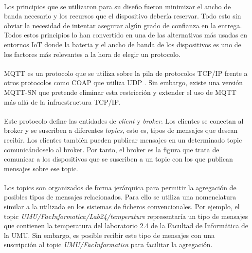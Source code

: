 \documentclass[12pt, a4paper]{article}
\begin{document}
        \paragraph{}
        Los principios que se utilizaron para su diseño fueron minimizar el ancho de banda necesario y los recursos que el dispositivo debería reservar. Todo esto sin obviar la necesidad de intentar asegurar algún grado de confianza en la entrega. Todos estos principios lo han convertido en una de las alternativas más usadas en entornos IoT donde la bateria y el ancho de banda de los dispositivos es uno de los factores más relevantes a la hora de elegir un protocolo.

        \paragraph{}
        MQTT es un protocolo que se utiliza sobre la pila de protocolos TCP/IP \cite{rfc793} frente a otros protocolos como COAP \cite{rfc7252} que utiliza UDP \cite{rfc768}. Sin embargo, existe una versión MQTT-SN que pretende eliminar esta restricción y extender el uso de MQTT más allá de la infraestructura TCP/IP.

        \paragraph{}
        Este protocolo define las entidades de \textit{client} y \textit{broker}. Los clientes se conectan al broker y se suscriben a diferentes \textit{topics}, esto es, tipos de mensajes que desean recibir. Los clientes también pueden publicar mensajes en un determinado topic comunicándoselo al broker. Por tanto, el broker es la figura que trata de comunicar a los dispositivos que se suscriben a un topic con los que publican mensajes sobre ese topic.

        \paragraph{}
        Los topics son organizados de forma jerárquica para permitir la agregación de posibles tipos de mensajes relacionados. Para ello se utiliza una nomenclatura similar a la utilizada en los sistemas de ficheros convencionales. Por ejemplo, el topic \textit{UMU/FacInformatica/Lab24/temperature} representaría un tipo de mensajes que contienen la temperatura del laboratorio 2.4 de la Facultad de Informática de la UMU. Sin embargo, es posible recibir este tipo de mensajes con una suscripción al topic \textit{UMU/FacInformatica} para facilitar la agregación.
\end{document}
